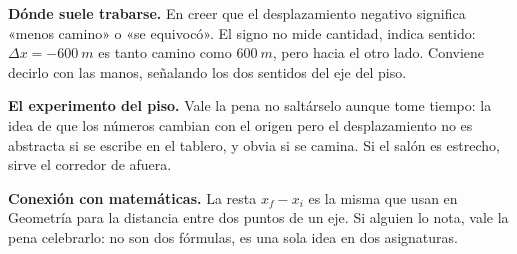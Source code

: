 \documentclass[11pt]{article}
\begin{document}
\begin{center}
\end{center}

\begin{nota}
\textbf{Dónde suele trabarse.} En creer que el desplazamiento negativo significa «menos
camino» o «se equivocó». El signo no mide cantidad, indica sentido: $\Delta x = \qty{-600}{m}$
es tanto camino como $\qty{+600}{m}$, pero hacia el otro lado. Conviene decirlo con las manos,
señalando los dos sentidos del eje del piso.
\end{nota}

\begin{nota}
\textbf{El experimento del piso.} Vale la pena no saltárselo aunque tome tiempo: la idea de
que los números cambian con el origen pero el desplazamiento no es abstracta si se escribe en
el tablero, y obvia si se camina. Si el salón es estrecho, sirve el corredor de afuera.
\end{nota}

\begin{nota}
\textbf{Conexión con matemáticas.} La resta $x_f - x_i$ es la misma que usan en Geometría para
la distancia entre dos puntos de un eje. Si alguien lo nota, vale la pena celebrarlo: no son
dos fórmulas, es una sola idea en dos asignaturas.
\end{nota}
\end{document}
